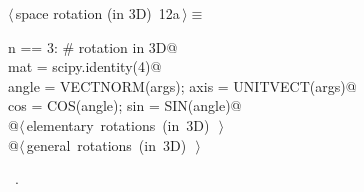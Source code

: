 \documentclass[11pt,oneside]{article}	%
\begin{document}
\begin{flushleft} \small \label{scrap25}
\protect{}$\langle\,$space rotation (in 3D)\nobreak\ {\footnotesize 12a}$\,\rangle\equiv$
\vspace{-1ex}
\begin{list}{}{} \item
\mbox{}\verb@if n == 3: # rotation in 3D@\\
\mbox{}\verb@   mat = scipy.identity(4)@\\
\mbox{}\verb@   angle = VECTNORM(args); axis = UNITVECT(args)@\\
\mbox{}\verb@   cos = COS(angle); sin = SIN(angle)@\\
\mbox{}\verb@   @\hbox{$\langle\,$elementary rotations (in 3D)\nobreak\ {\footnotesize {}}$\,\rangle$}\verb@@\\
\mbox{}\verb@   @\hbox{$\langle\,$general rotations (in 3D)\nobreak\ {\footnotesize {}}$\,\rangle$}\verb@@\\
\mbox{}\verb@@{\NWsep}
\end{list}
\vspace{-1ex}
\footnotesize\addtolength{\baselineskip}{-1ex}
\begin{list}{}{\setlength{\itemsep}{-\parsep}\setlength{\itemindent}{-\leftmargin}}
\item \NWtxtMacroRefIn\ .
\end{list}
\end{flushleft}
\end{document}
